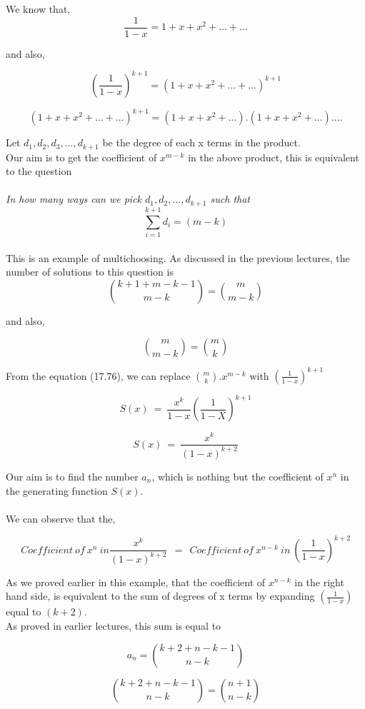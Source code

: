 We know that,
$$\frac{1}{1-x} = 1+x+x^2+\dots + \dots$$

and also,

$${\left(\frac{1}{1-x}\right)}^{k+1} = {(1+x+x^2+\dots+\dots)^{k+1}} $$

$${(1+x+x^2+\dots+\dots)^{k+1}} = (1+x+x^2+\dots).(1+x+x^2+\dots).\dots $$

Let $d_1,d_2,d_3,\dots,d_{k+1}$ be the degree of each x terms in the product.\\
Our aim is to get the coefficient of $x^{m-k}$ in the above product, this is equivalent to the question \\ \\
\emph{In how many ways can we pick $d_1,d_2,\dots,d_{k+1}$ such that} $$\sum_{i=1}^{k+1}d_i = (m-k)$$\\
This is an example of multichoosing. As discussed in the previous lectures, the number of solutions to this question is $${{k+1+m-k-1} \choose {m-k}} = {m \choose m-k}$$

and also,

$${m \choose m-k} = {m \choose k} $$

From the equation (17.76), we can replace ${m \choose k}.x^{m-k}$ with ${\left(\frac{1}{1-x}\right)}^{k+1}$

$$S(x)~=~\frac{x^k}{1-x}{\left(\frac{1}{1-X} \right)}^{k+1} $$

\begin{equation}
 S(x)~=~\frac{x^k}{{\left(1-x \right)}^{k+2}}
\end{equation}

Our aim is to find the number $a_n$, which is nothing but the coefficient of $x^n$ in the generating function $S(x)$.\\ \\

We can observe that the,

$$Coefficient~of~x^n~in \frac{x^k}{{\left(1-x \right)}^{k+2}}~~=~~Coefficient~of~x^{n-k}~in~{\left(\frac{1}{1-x}\right)}^{k+2}$$

As we proved earlier in this example, that the coefficient of $x^{n-k}$ in the right hand side, is equivalent to the sum of degrees of x terms by expanding $\left(\frac{1}{1-x}\right)$ equal to $(k+2)$.
\\
As proved in earlier lectures, this sum is equal to 

$$a_n = {{k+2+n-k-1} \choose {n-k}}$$

$${{k+2+n-k-1} \choose {n-k}} = {n+1 \choose n-k} $$

